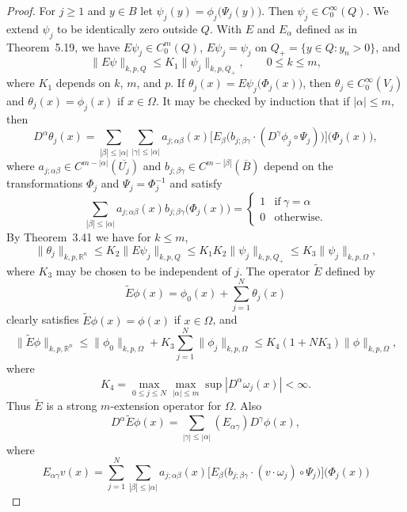 \begin{proof}
  For $j\geq 1$ and $y\in B$ let $\psi_j(y) = \phi_j\bigl(\Psi_j(y)\bigr)$.
  Then $\psi_j\in C_0^\infty(Q)$. We extend $\psi_j$ to be identically
  zero outside $Q$. With $E$ and $E_\alpha$ defined as in Theorem~5.19,
  we have $E\psi_j\in C_0^m(Q)$, $E\psi_j = \psi_j$ on $Q_+ = \{y\in Q: y_n>0\}$, and
  \[ \|E\psi\|_{k,p,Q} \leq K_1 \|\psi_j\|_{k,p,Q_+}, \qquad 0\leq k\leq m, \]
  where $K_1$ depends on $k$, $m$, and $p$. If $\theta_j(x) = E\psi_j\bigl(\Phi_j(x)\bigr)$,
  then $\theta_j \in C_0^\infty(V_j)$ and $\theta_j(x) = \phi_j(x)$ if $x\in\Omega$.
  It may be checked by induction that if $|\alpha|\leq m$, then
  \[ D^\alpha \theta_j(x) = \sum_{|\beta|\leq |\alpha|} \sum_{|\gamma|\leq |\alpha|}
      a_{j;\alpha\beta}(x) \bigl[E_{\beta} \bigl(b_{j;\beta\gamma} \cdot
      (D^\gamma \phi_j \circ \Psi_j)\bigr)\bigr] \bigl(\Phi_j(x)\bigr), \]
  where $a_{j;\alpha\beta} \in C^{m-|\alpha|} (\overline{U_j})$ and
  $b_{j;\beta\gamma} \in C^{m-|\beta|}(\overline{B})$ depend on the
  transformations $\Phi_j$ and $\Psi_j = \Phi_j^{-1}$ and satisfy
  \[ \sum_{|\beta|\leq |\alpha|} a_{j;\alpha\beta}(x)
      b_{j;\beta\gamma}\bigl(\Phi_j(x)\bigr)
      = \begin{cases}
        1 & \text{if}\ \gamma = \alpha \\
        0 & \text{otherwise}.
      \end{cases} \]
  By Theorem~3.41 we have for $k\leq m$,
  \[ \|\theta_j\|_{k,p,\mathbb{R}^n} \leq K_2 \|E\psi_j\|_{k,p,Q}
      \leq K_1K_2 \|\psi_j\|_{k,p,Q_+} \leq K_3 \|\psi_j\|_{k,p,\Omega}, \]
  where $K_3$ may be chosen to be independent of $j$. The operator $\tilde E$
  defined by
  \[ \tilde E \phi(x) = \phi_0(x) + \sum_{j=1}^N \theta_j(x) \]
  clearly satisfies $\tilde E \phi(x) = \phi(x)$ if $x\in\Omega$, and
  \begin{equation}\label{eq:5.24}
    \bigl\|\tilde E \phi\bigr\|_{k,p,\mathbb{R}^n}
    \leq \|\phi_0\|_{k,p,\Omega} + K_3 \sum_{j=1}^N \|\phi_j\|_{k,p,\Omega}
    \leq K_4 (1 + NK_3) \|\phi\|_{k,p,\Omega},
  \end{equation}
  where
  \[ K_4 = \max_{0\leq j\leq N} \max_{|\alpha|\leq m} \sup |D^{\alpha} \omega_j(x)| < \infty. \]
  Thus $\tilde E$ is a strong $m$-extension operator for $\Omega$. Also
  \[ D^{\alpha} \tilde{E} \phi(x) 
      = \sum_{|\gamma|\leq |\alpha|} (E_{\alpha\gamma}) D^{\gamma} \phi(x), \]
  where
  \[ E_{\alpha\gamma} v(x) = \sum_{j=1}^N \sum_{|\beta|\leq |\alpha|}
      a_{j;\alpha\beta}(x) \bigl[E_{\beta} \bigl(b_{j;\beta\gamma}
      \cdot (v\cdot\omega_j) \circ \Psi_j\bigr)\bigr] \bigl(\Phi_j(x)\bigr) \]

\end{proof}
